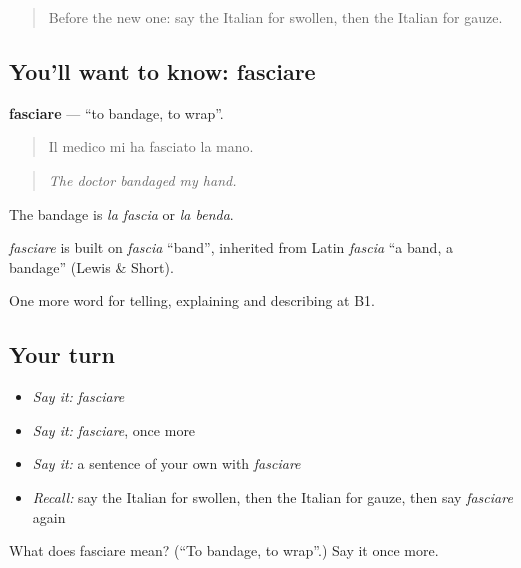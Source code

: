 \label{lesson:IT-C485-fasciare}



\begin{quote}
Before the new one: say the Italian for swollen, then the Italian for gauze.
\end{quote}

\subsection*{You'll want to know: fasciare}
\textbf{fasciare} — \textquotedblleft{}to bandage, to wrap\textquotedblright{}.

\begin{quote}
Il medico mi ha fasciato la mano.
\end{quote}

\begin{quote}
\emph{The doctor bandaged my hand.}
\end{quote}

The bandage is \emph{la fascia} or \emph{la benda}.

\begin{cousinweb}
\emph{fasciare} is built on \emph{fascia} \textquotedblleft{}band\textquotedblright{}, inherited from Latin \emph{fascia} \textquotedblleft{}a band, a bandage\textquotedblright{} (Lewis \& Short).
\end{cousinweb}

\begin{grammarlens}[title={What you've built}]
One more word for telling, explaining and describing at B1.
\end{grammarlens}

\subsection*{Your turn}
\begin{itemize}
\raggedright
  \item \emph{Say it:} \emph{fasciare}
  \item \emph{Say it:} \emph{fasciare}, once more
  \item \emph{Say it:} a sentence of your own with \emph{fasciare}
  \item \emph{Recall:} say the Italian for swollen, then the Italian for gauze, then say \emph{fasciare} again
\end{itemize}

\begin{tcolorbox}[breakable,colback=teal!4,colframe=teal!35!black,title={Before you move on}]
What does fasciare mean? (\textquotedblleft{}To bandage, to wrap\textquotedblright{}.) Say it once more.
\end{tcolorbox}
